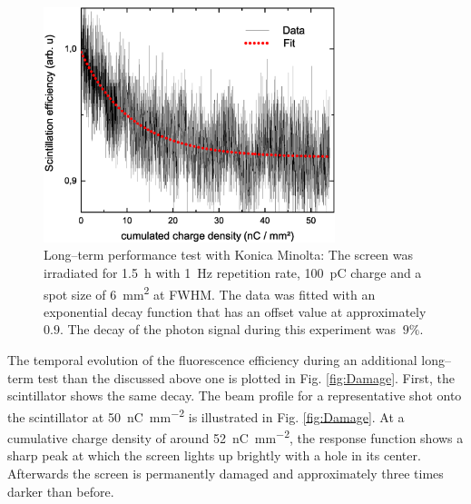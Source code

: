 \documentclass[%
preprint,
amsmath,
amssymb,
aip,
rsi, 
numerical,
floatfix,
]{revtex4-1}
\begin{document}
\begin{figure}
\includegraphics[width=8.5cm]{./Figures/Dt_Min_rel}%
\caption{\label{fig:Dt_Min_rel} Long--term performance test with Konica Minolta: 
The screen was irradiated  for \SI{1.5}{\hour} with \SI{1}{\hertz} repetition rate, \SI{100}{\pico\coulomb} charge and a spot size of \SI{6}{\square\milli\meter} at FWHM. 
The data was fitted with an exponential decay function that has an offset value at approximately $0.9$. 
The decay of the photon signal during this experiment was $~9\%$.}
\end{figure}

The temporal evolution of the fluorescence efficiency during an additional long--term test than the discussed above one is plotted in Fig. \ref{fig:Damage}.
First, the scintillator shows the same decay. 
The beam profile for a representative shot onto the scintillator at \SI[per-mode=symbol]{50}{\nano \coulomb \per \square \milli \meter} is illustrated in Fig. \ref{fig:Damage}.
At a cumulative charge density of around \SI[per-mode=symbol]{52}{\nano \coulomb \per \square \milli \meter}, the response function shows a sharp peak at which the screen lights up brightly with a hole in its center.
Afterwards the screen is permanently damaged and approximately three times darker than before.
\end{document}

